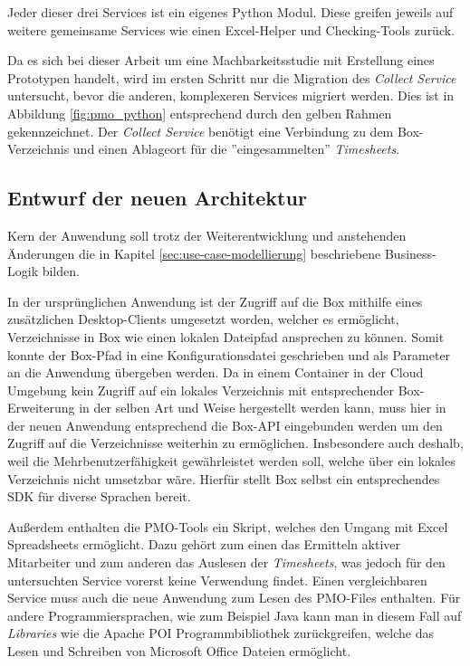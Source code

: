 Jeder dieser drei Services ist ein eigenes Python Modul. Diese greifen jeweils auf weitere gemeinsame Services wie einen Excel-Helper und Checking-Tools zurück.

Da es sich bei dieser Arbeit um eine Machbarkeitsstudie mit Erstellung eines Prototypen handelt, wird im ersten Schritt nur die Migration des \textit{Collect Service} untersucht, bevor die anderen, komplexeren Services migriert werden. Dies ist in Abbildung \ref{fig:pmo_python} entsprechend durch den gelben Rahmen gekennzeichnet. Der \textit{Collect Service} benötigt eine Verbindung zu dem \gls{Box}-Verzeichnis und einen Ablageort für die ''eingesammelten'' \textit{\glspl{Timesheet}}.
\pagebreak

\subsection{Entwurf der neuen Architektur}
Kern der Anwendung soll trotz der Weiterentwicklung und anstehenden Änderungen die in Kapitel \ref{sec:use-case-modellierung} beschriebene Business-Logik bilden.

In der ursprünglichen Anwendung ist der Zugriff auf die \gls{Box} mithilfe eines zusätzlichen Desktop-Clients umgesetzt worden, welcher es ermöglicht, Verzeichnisse in \gls{Box} wie einen lokalen Dateipfad ansprechen zu können. Somit konnte der Box-Pfad in eine Konfigurationsdatei geschrieben und als Parameter an die Anwendung übergeben werden. Da in einem Container in der Cloud Umgebung kein Zugriff auf ein lokales Verzeichnis mit entsprechender \gls{Box}-Erweiterung in der selben Art und Weise hergestellt werden kann, muss hier in der neuen Anwendung entsprechend die \gls{Box}-\ac{API} eingebunden werden um den Zugriff auf die Verzeichnisse weiterhin zu ermöglichen. Insbesondere auch deshalb, weil die Mehrbenutzerfähigkeit gewährleistet werden soll, welche über ein lokales Verzeichnis nicht umsetzbar wäre. Hierfür stellt \gls{Box} selbst ein entsprechendes \ac{SDK} für diverse Sprachen bereit.

Außerdem enthalten die PMO-Tools ein Skript, welches den Umgang mit Excel Spreadsheets ermöglicht. Dazu gehört zum einen das Ermitteln aktiver Mitarbeiter und zum anderen das Auslesen der \textit{\glspl{Timesheet}}, was jedoch für den untersuchten Service vorerst keine Verwendung findet. Einen vergleichbaren Service muss auch die neue Anwendung zum Lesen des PMO-Files enthalten. Für andere Programmiersprachen, wie zum Beispiel Java kann man in diesem Fall auf \textit{Libraries} wie die \gls{Apache POI} Programmbibliothek zurückgreifen, welche das Lesen und Schreiben von Microsoft Office Dateien ermöglicht.

